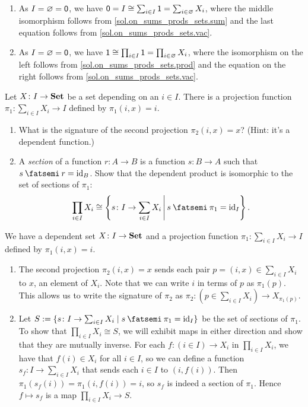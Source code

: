 \documentclass[Book-Poly]{subfiles}
\begin{document}
\begin{exercise}
\begin{solution}
\begin{enumerate}[resume]
    \item As $I = \varnothing = \textsf{0}$, we have $\textsf{0} = I \cong \sum_{i \in I} \textsf{1} = \sum_{i \in \varnothing} X_i$, where the middle isomorphism follows from \cref{sol.on_sums_prods_sets.sum} and the last equation follows from \cref{sol.on_sums_prods_sets.vac}.
    
    \item As $I = \varnothing = \textsf{0}$, we have $\textsf{1} \cong \prod_{i \in I} \textsf{1} = \prod_{i \in \varnothing} X_i$, where the isomorphism on the left follows from \cref{sol.on_sums_prods_sets.prod} and the equation on the right follows from \cref{sol.on_sums_prods_sets.vac}.
\end{enumerate}
\end{solution}
\end{exercise}

\begin{exercise}\label{exc.dependent_product_as_sections}
  Let $X \colon I \to \mathbf{Set}$ be a set depending on an $i \in I$. There is a
  projection function
  $\pi_1 \colon \sum_{i \in I} X_i \to I$
  defined by $\pi_1(i, x) = i$.
  \begin{enumerate}
    \item What is the signature of the second projection $\pi_2(i, x) = x$?
    (Hint: it's a dependent function.)
    \item A \emph{section} of a function $r \colon A \to B$ is a function $s \colon B \to A$ such that $s \then r = \id_B$.
    Show that the dependent product is isomorphic to the set of sections of $\pi_1$:
    \[\prod_{i \in I} X_i \cong \left\{s \colon I \to \sum_{i \in I} X_i \,\middle|\, s \then \pi_1 = \id_I\right\}.\]
    \qedhere
  \end{enumerate}
\begin{solution}
We have a dependent set $X \colon I \to \mathbf{Set}$ and a projection function $\pi_1 \colon \sum_{i \in I} X_i \to I$ defined by $\pi_1(i, x) = i$.
\begin{enumerate}
    \item The second projection $\pi_2(i, x) = x$ sends each pair $p = (i, x) \in \sum_{i \in I} X_i$ to $x$, an element of $X_i$.
    Note that we can write $i$ in terms of $p$ as $\pi_1(p)$.
    This allows us to write the signature of $\pi_2$ as $\pi_2 \colon (p \in \sum_{i \in I} X_i) \to X_{\pi_1(p)}$.
    
    \item Let $S := \{s \colon I \to \sum_{i \in I} X_i \mid s \then \pi_1 = \id_I\}$ be the set of sections of $\pi_1$. To show that $\prod_{i \in I} X_i \cong S$, we will exhibit maps in either direction and show that they are mutually inverse.
    For each $f \colon (i \in I) \to X_i$ in $\prod_{i \in I} X_i$, we have that $f(i) \in X_i$ for all $i \in I$, so we can define a function $s_f \colon I \to \sum_{i \in I} X_i$ that sends each $i \in I$ to $(i, f(i))$.
    Then $\pi_1(s_f(i)) = \pi_1(i, f(i)) = i$, so $s_f$ is indeed a section of $\pi_1$.
    Hence $f \mapsto s_f$ is a map $\prod_{i \in I} X_i \to S$.
    

\end{enumerate}
\end{solution}
\end{exercise}
\end{document}
